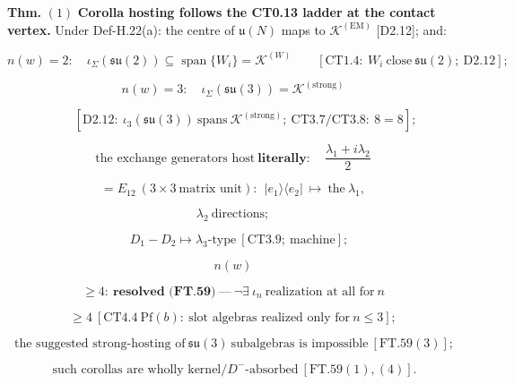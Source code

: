 \begin{theorem}\label{tag:FT-58}
\textbf{Thm.} $(1)$ \textbf{Corolla hosting follows the CT0.13 ladder at the contact vertex.} Under Def-H.22(a): the centre of $\mathfrak u(N)$ maps to $\mathcal K^{(\mathrm{EM})}$ [D2.12]; and:

\[
n(w)=2:\quad\iota_\Sigma(\mathfrak{su}(2))\subseteq\operatorname{span}\{W_i\}=\mathcal K^{(W)}\qquad[\mathrm{CT1.4}:\ W_i\ \text{close}\ \mathfrak{su}(2);\ \mathrm{D2.12}];
\]

\[
n(w)=3:\quad\iota_\Sigma(\mathfrak{su}(3))=\mathcal K^{(\mathrm{strong})}
\]

\[
\qquad [\mathrm{D2.12}:\ \iota_3(\mathfrak{su}(3))\ \text{spans}\ \mathcal K^{(\mathrm{strong})};\ \mathrm{CT3.7}/\mathrm{CT3.8}:\ 8=8];
\]

\[
\text{the exchange generators host}\ \textbf{literally}:\quad\frac{\lambda_1+i\lambda_2}{2}
\]

\[
= E_{12}\ (3\times3\ \text{matrix unit}):\ \ |e_1\rangle\langle e_2|\ \mapsto\ \text{the}\ \lambda_1,
\]

\[
\lambda_2\ \text{directions};
\]

\[
\quad D_1-D_2\mapsto\lambda_3\text{-type}\ [\mathrm{CT3.9};\ \text{machine}];
\]

\[
n(w)
\]

\[
\ge 4:\ \textbf{resolved (FT.59)}\ —\ \neg\exists\ \iota_n\ \text{realization at all for}\ n
\]

\[
\ge 4\ [\mathrm{CT4.4}\ \text{Pf}(b):\ \text{slot algebras realized only for}\ n\le3];
\]

\[
\ \text{the suggested strong-hosting of}\ \mathfrak{su}(3)\ \text{subalgebras is impossible}\ [\mathrm{FT.59}(3)];
\]

\[
\ \text{such corollas are wholly kernel}/D^-\text{-absorbed}\ [\mathrm{FT.59}(1),(4)].
\]


\end{theorem}
